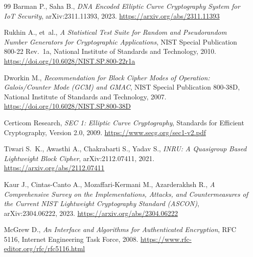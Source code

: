 \documentclass[12pt,a4paper,twoside]{report}
\numberwithin{equation}{chapter}
\begin{document}
\begin{thebibliography}{99}
Barman P., Saha B.,
\emph{DNA Encoded Elliptic Curve Cryptography System for IoT Security},
arXiv:2311.11393, 2023.
\url{https://arxiv.org/abs/2311.11393}

Rukhin A., et~al.,
\emph{A Statistical Test Suite for Random and Pseudorandom Number
Generators for Cryptographic Applications}, NIST Special Publication
800-22 Rev.~1a, National Institute of Standards and Technology, 2010.
\url{https://doi.org/10.6028/NIST.SP.800-22r1a}

Dworkin M.,
\emph{Recommendation for Block Cipher Modes of Operation:
Galois/Counter Mode (GCM) and GMAC}, NIST Special Publication
800-38D, National Institute of Standards and Technology, 2007.
\url{https://doi.org/10.6028/NIST.SP.800-38D}

Certicom Research,
\emph{SEC 1: Elliptic Curve Cryptography}, Standards for Efficient
Cryptography, Version 2.0, 2009.
\url{https://www.secg.org/sec1-v2.pdf}

Tiwari S.~K., Awasthi A., Chakrabarti S., Yadav S.,
\emph{INRU: A Quasigroup Based Lightweight Block Cipher},
arXiv:2112.07411, 2021.
\url{https://arxiv.org/abs/2112.07411}

Kaur J., Cintas-Canto A., Mozaffari-Kermani M., Azarderakhsh R.,
\emph{A Comprehensive Survey on the Implementations, Attacks, and
Countermeasures of the Current NIST Lightweight Cryptography Standard
(ASCON)}, arXiv:2304.06222, 2023.
\url{https://arxiv.org/abs/2304.06222}

McGrew D.,
\emph{An Interface and Algorithms for Authenticated Encryption}, RFC
5116, Internet Engineering Task Force, 2008.
\url{https://www.rfc-editor.org/rfc/rfc5116.html}

\end{thebibliography}


\listoffigures
{}
\listoftables
{}
\lstlistoflistings
{}
\end{document}
